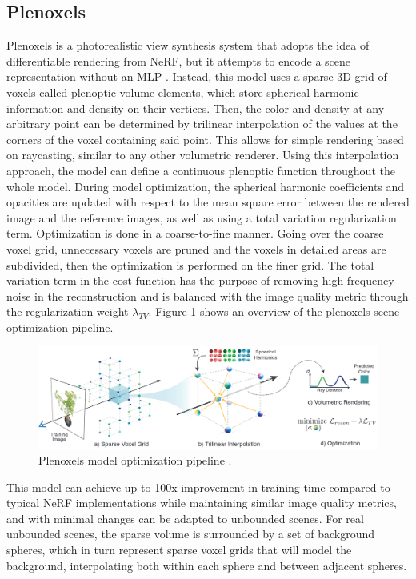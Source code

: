 \subsection{Plenoxels}
Plenoxels is a photorealistic view synthesis system that adopts the idea of differentiable rendering from NeRF, but it attempts to encode a scene representation without an MLP \cite{yu_and_fridovichkeil2021plenoxels}. Instead, this model uses a sparse 3D grid of voxels called plenoptic volume elements, which store spherical harmonic information and density on their vertices. Then, the color and density at any arbitrary point can be determined by trilinear interpolation of the values at the corners of the voxel containing said point. This allows for simple rendering based on raycasting, similar to any other volumetric renderer. Using this interpolation approach, the model can define a continuous plenoptic function throughout the whole model. During model optimization, the spherical harmonic coefficients and opacities are updated with respect to the mean square error between the rendered image and the reference images, as well as using a total variation regularization term. Optimization is done in a coarse-to-fine manner. Going over the coarse voxel grid, unnecessary voxels are pruned and the voxels in detailed areas are subdivided, then the optimization is performed on the finer grid. The total variation term in the cost function has the purpose of removing high-frequency noise in the reconstruction and is balanced with the image quality metric through the regularization weight $\lambda_{TV}$. Figure \ref{fig:plenoxel} shows an overview of the plenoxels scene optimization pipeline.

\begin{figure}[H]
    \centering
    \includegraphics[width=0.7\linewidth]{figures/plenoxels.png}
    \caption{Plenoxels model optimization pipeline \cite{yu_and_fridovichkeil2021plenoxels}.}
    \label{fig:plenoxel}
\end{figure}

This model can achieve up to 100x improvement in training time compared to typical NeRF implementations while maintaining similar image quality metrics, and with minimal changes can be adapted to unbounded scenes. For real unbounded scenes, the sparse volume is surrounded by a set of background spheres, which in turn represent sparse voxel grids that will model the background, interpolating both within each sphere and between adjacent spheres.

